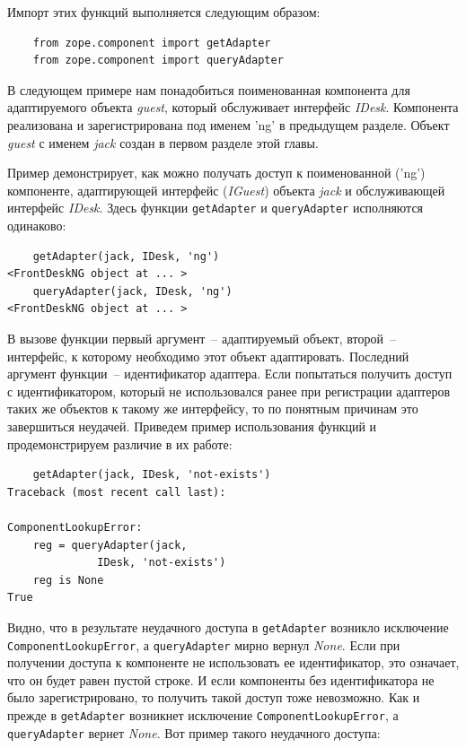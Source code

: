 \documentclass[a4paper,openany,twoside,final]{book}
\providecommand*{\DUroletitlereference}[1]{\textsl{#1}}
\begin{document}
Импорт этих функций выполняется следующим образом:

\begin{verbatim}
    from zope.component import getAdapter
    from zope.component import queryAdapter
\end{verbatim}

В следующем примере нам понадобиться поименованная компонента для адаптируемого объекта \DUroletitlereference{guest}, который обслуживает интерфейс \DUroletitlereference{IDesk}.  Компонента реализована и зарегистрирована под именем 'ng' в предыдущем разделе.  Объект \DUroletitlereference{guest} с именем \DUroletitlereference{jack} создан в первом разделе этой главы.

Пример демонстрирует, как можно получать доступ к поименованной ('ng') компоненте, адаптирующей интерфейс (\DUroletitlereference{IGuest}) объекта \DUroletitlereference{jack} и обслуживающей интерфейс \DUroletitlereference{IDesk}.  Здесь функции \texttt{getAdapter} и \texttt{queryAdapter} исполняются одинаково:

\begin{verbatim}
    getAdapter(jack, IDesk, 'ng')
<FrontDeskNG object at ... >
    queryAdapter(jack, IDesk, 'ng')
<FrontDeskNG object at ... >
\end{verbatim}

В вызове функции первый аргумент~-- адаптируемый объект, второй~-- интерфейс, к которому необходимо этот объект адаптировать.  Последний аргумент функции~-- идентификатор адаптера.  Если попытаться получить доступ с идентификатором, который не использовался ранее при регистрации адаптеров таких же объектов к такому же интерфейсу, то по понятным причинам это завершиться неудачей.  Приведем пример использования функций и продемонстрируем различие в их работе:

\begin{verbatim}
    getAdapter(jack, IDesk, 'not-exists')
Traceback (most recent call last):

ComponentLookupError:
    reg = queryAdapter(jack,
              IDesk, 'not-exists')
    reg is None
True
\end{verbatim}

Видно, что в результате неудачного доступа в \texttt{getAdapter} возникло исключение \texttt{ComponentLookupError}, а \texttt{queryAdapter} мирно вернул \DUroletitlereference{None}.  Если при получении доступа к компоненте не использовать ее идентификатор, это означает, что он будет равен пустой строке.  И если компоненты без идентификатора не было зарегистрировано, то получить такой доступ тоже невозможно.  Как и прежде в \texttt{getAdapter} возникнет исключение \texttt{ComponentLookupError}, а \texttt{queryAdapter} вернет \DUroletitlereference{None}.  Вот пример такого неудачного доступа:
\end{document}
